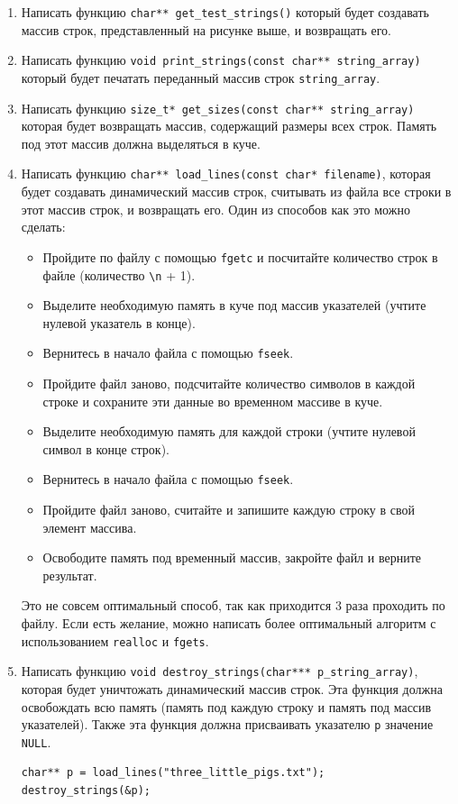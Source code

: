 \documentclass[10pt]{article}
\begin{document}
\begin{enumerate}
\item Написать функцию \texttt{char** get\_test\_strings()} который будет создавать массив строк, представленный на рисунке выше, и возвращать его.

\item Написать функцию \texttt{void print\_strings(const char** string\_array)} который будет печатать переданный массив строк \texttt{string\_array}.

\item Написать функцию \texttt{size\_t* get\_sizes(const char** string\_array)} которая будет возвращать массив, содержащий размеры всех строк. Память под этот массив должна выделяться в куче.

\item Написать функцию \texttt{char** load\_lines(const char* filename)},
которая будет создавать динамический массив строк, считывать из файла все строки в этот массив строк, и возвращать его. Один из способов как это можно сделать:
\begin{itemize}
\item Пройдите по файлу с помощью \texttt{fgetc} и посчитайте количество строк в файле (количество \texttt{\textbackslash n} + 1).
\item Выделите необходимую память в куче под массив указателей (учтите нулевой указатель в конце).
\item Вернитесь в начало файла с помощью \texttt{fseek}.
\item Пройдите файл заново, подсчитайте количество символов в каждой строке и сохраните эти данные во временном массиве в куче.
\item Выделите необходимую память для каждой строки (учтите нулевой символ в конце строк).
\item Вернитесь в начало файла с помощью \texttt{fseek}.
\item Пройдите файл заново, считайте и запишите каждую строку в свой элемент массива.
\item Освободите память под временный массив, закройте файл и верните результат.
\end{itemize}
Это не совсем оптимальный способ, так как приходится 3 раза проходить по файлу. Если есть желание, можно написать более оптимальный алгоритм с использованием \texttt{realloc} и \texttt{fgets}.
\item Написать функцию \texttt{void destroy\_strings(char*** p\_string\_array)}, которая будет уничтожать динамический массив строк. Эта функция должна освобождать всю память (память под каждую строку и память под массив указателей). Также эта функция должна присваивать указателю \texttt{p} значение \texttt{NULL}.
\begin{lstlisting}
char** p = load_lines("three_little_pigs.txt");
destroy_strings(&p);
\end{lstlisting}


\end{enumerate}
\end{document}
